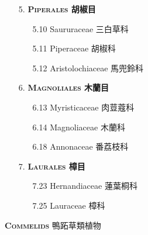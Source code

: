 \begin{enumerate}
  \item[5. ] \textbf{\textsc{Piperales} 胡椒目}   
    \begin{enumerate}
      \item[5.10] Saururaceae 三白草科     
        
      \item[5.11] Piperaceae 胡椒科     
        
      \item[5.12] Aristolochiaceae 馬兜鈴科     
        
    \end{enumerate}
  \item[6. ] \textbf{\textsc{Magnoliales} 木蘭目}   
    \begin{enumerate}
      \item[6.13] Myristicaceae 肉荳蔻科     
        
      \item[6.14] Magnoliaceae 木蘭科     
        
      \item[6.18] Annonaceae 番荔枝科     
        
    \end{enumerate}
  \item[7. ] \textbf{\textsc{Laurales} 樟目}   
    \begin{enumerate}
      \item[7.23] Hernandiaceae 蓮葉桐科     
        
      \item[7.25] Lauraceae 樟科     
        
    \end{enumerate}
\end{enumerate}
\vspace{2ex} 
\noindent \normalsize\textsc{\textbf{Commelids} 鴨跖草類植物}\selectfont \\
\footnotesize\selectfont

